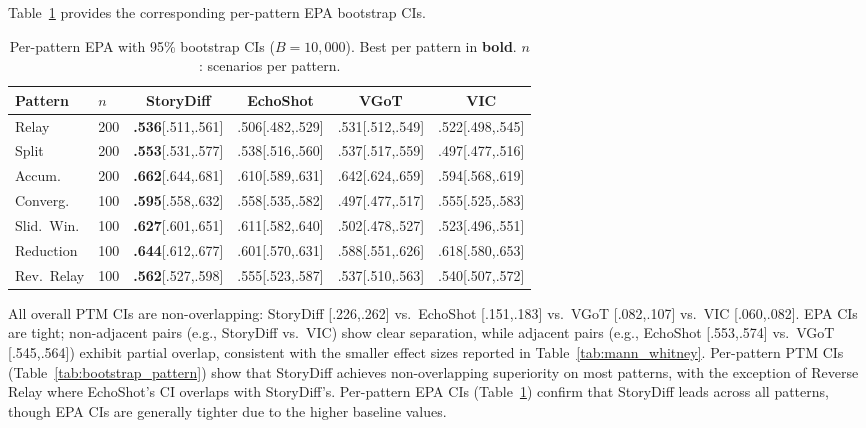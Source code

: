 \documentclass[sigconf,review,anonymous]{acmart}
\begin{document}
Table~\ref{tab:bootstrap_pattern_epa} provides the corresponding per-pattern EPA bootstrap CIs.
\begin{table}[H]
\caption{Per-pattern EPA with 95\% bootstrap CIs ($B = 10{,}000$). Best per pattern in \textbf{bold}. $n$: scenarios per pattern.}
\label{tab:bootstrap_pattern_epa}
\centering
\small
\setlength{\tabcolsep}{2pt}
\begin{tabular}{@{}ll cccc@{}}
\toprule
Pattern & $n$ & StoryDiff & EchoShot & VGoT & VIC \\
\midrule
Relay          & 200 & \textbf{.536}{\tiny [.511,.561]} & .506{\tiny [.482,.529]} & .531{\tiny [.512,.549]} & .522{\tiny [.498,.545]} \\
Split          & 200 & \textbf{.553}{\tiny [.531,.577]} & .538{\tiny [.516,.560]} & .537{\tiny [.517,.559]} & .497{\tiny [.477,.516]} \\
Accum.         & 200 & \textbf{.662}{\tiny [.644,.681]} & .610{\tiny [.589,.631]} & .642{\tiny [.624,.659]} & .594{\tiny [.568,.619]} \\
Converg.       & 100 & \textbf{.595}{\tiny [.558,.632]} & .558{\tiny [.535,.582]} & .497{\tiny [.477,.517]} & .555{\tiny [.525,.583]} \\
Slid.\ Win.    & 100 & \textbf{.627}{\tiny [.601,.651]} & .611{\tiny [.582,.640]} & .502{\tiny [.478,.527]} & .523{\tiny [.496,.551]} \\
Reduction      & 100 & \textbf{.644}{\tiny [.612,.677]} & .601{\tiny [.570,.631]} & .588{\tiny [.551,.626]} & .618{\tiny [.580,.653]} \\
Rev.\ Relay    & 100 & \textbf{.562}{\tiny [.527,.598]} & .555{\tiny [.523,.587]} & .537{\tiny [.510,.563]} & .540{\tiny [.507,.572]} \\
\bottomrule
\end{tabular}
\end{table}

All overall PTM CIs are non-overlapping: StoryDiff [.226,.262] vs.\ EchoShot [.151,.183] vs.\ VGoT [.082,.107] vs.\ VIC [.060,.082].
EPA CIs are tight; non-adjacent pairs (e.g., StoryDiff vs.\ VIC) show clear separation, while adjacent pairs (e.g., EchoShot [.553,.574] vs.\ VGoT [.545,.564]) exhibit partial overlap, consistent with the smaller effect sizes reported in Table~\ref{tab:mann_whitney}.
Per-pattern PTM CIs (Table~\ref{tab:bootstrap_pattern}) show that StoryDiff achieves non-overlapping superiority on most patterns, with the exception of Reverse Relay where EchoShot's CI overlaps with StoryDiff's. Per-pattern EPA CIs (Table~\ref{tab:bootstrap_pattern_epa}) confirm that StoryDiff leads across all patterns, though EPA CIs are generally tighter due to the higher baseline values.
\end{document}
